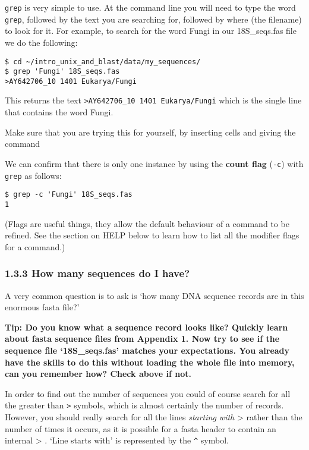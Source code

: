 \documentclass[11pt]{article}
\begin{document}
\texttt{grep} is very simple to use. At the command line you will need
to type the word \texttt{grep}, followed by the text you are searching
for, followed by where (the filename) to look for it. For example, to
search for the word Fungi in our 18S\_seqs.fas file we do the following:

\begin{verbatim}
$ cd ~/intro_unix_and_blast/data/my_sequences/
$ grep 'Fungi' 18S_seqs.fas
>AY642706_10 1401 Eukarya/Fungi
\end{verbatim}

This returns the text
\texttt{\textgreater{}AY642706\_10\ 1401\ Eukarya/Fungi} which is the
single line that contains the word Fungi.

Make sure that you are trying this for yourself, by inserting cells and
giving the command

We can confirm that there is only one instance by using the
\textbf{count flag} (\texttt{-c}) with \texttt{grep} as follows:

\begin{verbatim}
$ grep -c 'Fungi' 18S_seqs.fas
1
\end{verbatim}

(Flags are useful things, they allow the default behaviour of a command
to be refined. See the section on HELP below to learn how to list all
the modifier flags for a command.)

    \hypertarget{how-many-sequences-do-i-have}{%
\subsubsection{1.3.3 How many sequences do I
have?}\label{how-many-sequences-do-i-have}}

A very common question is to ask is `how many DNA sequence records are
in this enormous fasta file?'

\textbf{Tip: Do you know what a sequence record looks like? Quickly
learn about fasta sequence files from Appendix 1. Now try to see if the
sequence file `18S\_seqs.fas' matches your expectations. You already
have the skills to do this without loading the whole file into memory,
can you remember how? Check above if not.}

In order to find out the number of sequences you could of course search
for all the greater than \texttt{\textgreater{}} symbols, which is
almost certainly the number of records. However, you should really
search for all the lines \emph{starting with} \textgreater{} rather than
the number of times it occurs, as it is possible for a fasta header to
contain an internal \textgreater{} . `Line starts with' is represented
by the \texttt{\^{}} symbol.
\end{document}
